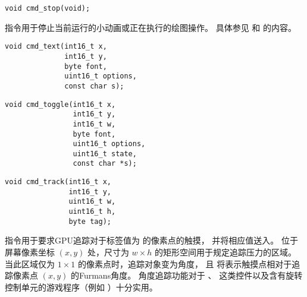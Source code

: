 
\begin{framed}
\begin{verbatim}
void cmd_stop(void);
\end{verbatim}
\end{framed}

 指令用于停止当前运行的小动画或正在执行的绘图操作。
具体参见  和  的内容。



\begin{framed}
\begin{verbatim}
void cmd_text(int16_t x,
              int16_t y,
              byte font,
              uint16_t options,
              const char s);
\end{verbatim}
\end{framed}



\begin{framed}
\begin{verbatim}
void cmd_toggle(int16_t x,
                int16_t y,
                int16_t w,
                byte font,
                uint16_t options,
                uint16_t state,
                const char *s);
\end{verbatim}
\end{framed}




\begin{framed}
\begin{verbatim}
void cmd_track(int16_t x,
               int16_t y,
               uint16_t w,
               uint16_t h,
               byte tag);
\end{verbatim}
\end{framed}

 指令用于要求GPU追踪对于标签值为  的像素点的触摸，
并将相应值送入。
位于屏幕像素坐标 $(x, y)$ 处，尺寸为 $w \times h$ 的矩形空间用于规定追踪压力的区域。
当此区域仅为 $1 \times 1$ 的像素点时，追踪对象变为角度，
且  将表示触摸点相对于追踪像素点 $(x, y)$ 的Furmans角度。
角度追踪功能对于  、  这类控件以及含有旋转控制单元的游戏程序（例如  ）十分实用。

